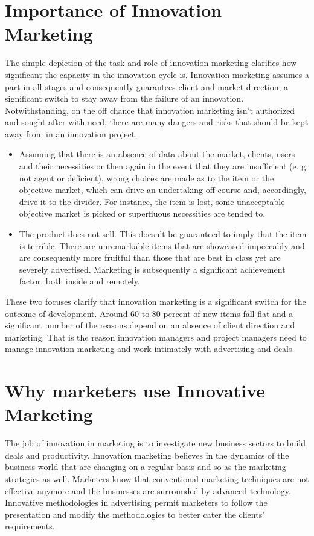 \documentclass{article}
\begin{document}
\section{Importance of Innovation Marketing}
The simple depiction of the task and role of innovation marketing clarifies how
significant the capacity in the innovation cycle is. Innovation marketing assumes a part
in all stages and consequently guarantees client and market direction, a significant
switch to stay away from the failure of
an innovation.
Notwithstanding, on the off chance that
innovation marketing isn't authorized
and sought after with need, there are
many dangers and risks that should be
kept away from in an innovation project.

\begin{itemize}
\item Assuming that there is an absence
of data about the market, clients,
users and their necessities or then
again in the event that they are
insufficient (e. g. not agent or
deficient), wrong choices are made
as to the item or the objective
market, which can drive an
undertaking off course and, accordingly, drive it to the divider. For instance, the item
is lost, some unacceptable objective market is picked or superfluous necessities
are tended to.

\item The product does not sell. This doesn't be guaranteed to imply that the item is
terrible. There are unremarkable items that are showcased impeccably and are
consequently more fruitful than those that are best in class yet are severely
advertised. Marketing is subsequently a significant achievement factor, both inside
and remotely.
\end{itemize}
These two focuses clarify that innovation marketing is a significant switch for the
outcome of development. Around 60 to 80 percent of new items fall flat and a
significant number of the reasons depend on an absence of client direction and
marketing. That is the reason innovation managers and project managers need to
manage innovation marketing and work intimately with advertising and deals.

\section{Why marketers use Innovative Marketing}
The job of innovation in marketing is to investigate new business sectors to build deals
and productivity. Innovation marketing believes in the dynamics of the business world
that are changing on a regular basis and so as the marketing strategies as well.
Marketers know that conventional marketing techniques are not effective anymore and
the businesses are surrounded by advanced technology. Innovative methodologies in
advertising permit marketers to follow the presentation and modify the methodologies
to better cater the clients' requirements.
\end{document}
